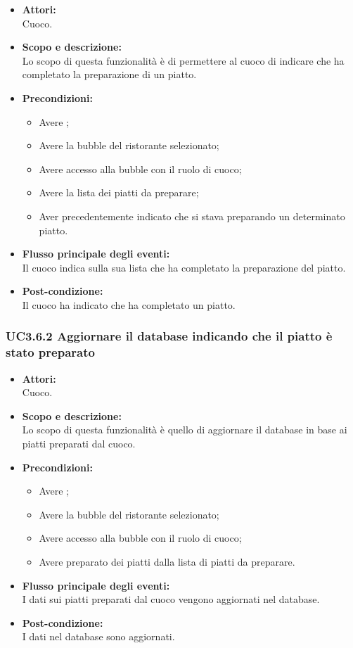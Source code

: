 \begin{itemize}
	\item \textbf{Attori:}
	\\Cuoco.
	\item \textbf{Scopo e descrizione:} 
	\\Lo scopo di questa funzionalità è di permettere al cuoco di indicare che ha completato la preparazione di un piatto.
	\item \textbf{Precondizioni:}
	\begin{itemize}
		\item Avere ;
		\item Avere la bubble del ristorante selezionato;
		\item Avere accesso alla bubble con il ruolo di cuoco;
		\item Avere la lista dei piatti da preparare;
		\item Aver precedentemente indicato che si stava preparando un determinato piatto.
	\end{itemize}
	\item \textbf{Flusso principale degli eventi:}
	\\Il cuoco indica sulla sua lista che ha completato la preparazione del piatto.
	\item \textbf{Post-condizione:}
	\\Il cuoco ha indicato che ha completato un piatto.
\end{itemize}

\subsubsection{UC3.6.2 Aggiornare il database indicando che il piatto è stato preparato} \label{UC3.6.2}

\begin{itemize}
	\item \textbf{Attori:}
	\\Cuoco.
	\item \textbf{Scopo e descrizione:} 
	\\Lo scopo di questa funzionalità è quello di aggiornare il database in base ai piatti preparati dal cuoco.
	\item \textbf{Precondizioni:}
	\begin{itemize}
		\item Avere ;
		\item Avere la bubble del ristorante selezionato;
		\item Avere accesso alla bubble con il ruolo di cuoco;
		\item Avere preparato dei piatti dalla lista di piatti da preparare.
	\end{itemize}
	\item \textbf{Flusso principale degli eventi:}
	\\I dati sui piatti preparati dal cuoco vengono aggiornati nel database.
	\item \textbf{Post-condizione:}
	\\I dati nel database sono aggiornati.
\end{itemize}

